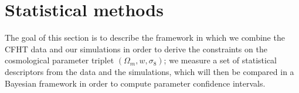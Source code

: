 \documentclass[reprint,aps,prd,superscriptaddress,showkeys,showpacs]{revtex4-1}
\begin{document}


\section{Statistical methods}
The goal of this section is to describe the framework in which we combine the CFHT data and our simulations in order to derive the constraints on the cosmological parameter triplet $(\Omega_m,w,\sigma_8)$; we measure a set of statistical descriptors from the data and the simulations, which will then be compared in a Bayesian framework in order to compute parameter confidence intervals.
\end{document}
